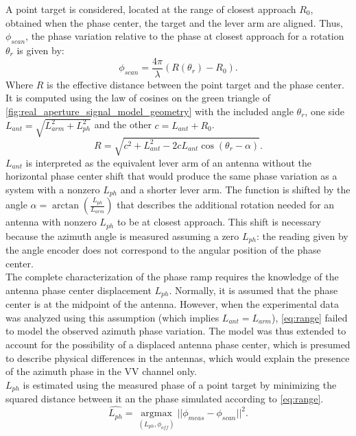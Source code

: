 A point target is considered, located at the  range of closest approach $R_{0}$, obtained when the phase center, the target and the lever arm are aligned. Thus, $\phi_{scan}$, the phase variation relative to the phase at closest approach for a rotation  $\theta_r$  is given by:
\begin{equation}\label{eq:range_phase}
	\phi_{scan} = \frac{4 \pi}{\lambda}\left(R\left(\theta_r\right) - R_0\right) .
\end{equation}
Where $R$ is the effective distance between the point target and the phase center.
It is computed using the law of cosines on the green triangle of \autoref{fig:real_aperture_signal_model_geometry} with the included angle $\theta_r$, one  side $L_{ant} = \sqrt{L_{arm}^2 + L_{ph}^2}$ and the other $c = L_{ant} + R_0$.
\begin{equation}\label{eq:range}
	R = \sqrt{ c^2 +  L_{ant}^2 - 2 c L_{ant} \cos{\left(\theta_r - \alpha\right)}}.
\end{equation}
$L_{ant}$ is interpreted as the equivalent lever arm of an antenna without the horizontal phase center shift that would produce the same phase variation as a system with a nonzero $L_{ph}$ and a shorter lever arm.
The function is shifted by the angle  $\alpha = \operatorname{\arctan}\left({\frac{L_{ph}}{L_{arm}}}\right)$ that describes the additional rotation needed for an antenna with nonzero $L_{ph}$ to be at closest approach. This shift is necessary because the azimuth angle is measured assuming a zero $L_{ph}$: the reading given by the angle encoder does not correspond to the angular position of the phase center.\\
The complete characterization of the phase ramp requires the knowledge of the antenna phase center displacement $L_{ph}$. Normally, it is assumed that the phase center is at the midpoint of the antenna. However, when the experimental data was analyzed using this assumption (which implies $L_{ant} = L_{arm}$),  \autoref{eq:range} failed to model the observed azimuth phase variation. The model was thus extended to account for the possibility of a displaced antenna phase center, which is presumed to describe physical differences in the antennas, which would explain the presence of the azimuth phase in the VV channel only.\\ $L_{ph}$ is estimated using the measured phase of a point target by minimizing the squared distance between it an the phase simulated according to \autoref{eq:range}.
\begin{equation}\label{eq:rph_estimation}
	\hat{L_{ph}} = \underset{\left(L_{ph}, \phi_{off}\right)}{\operatorname{argmax}}{\vert\vert\phi_{meas} - \phi_{scan}\vert\vert}^2.
\end{equation}

